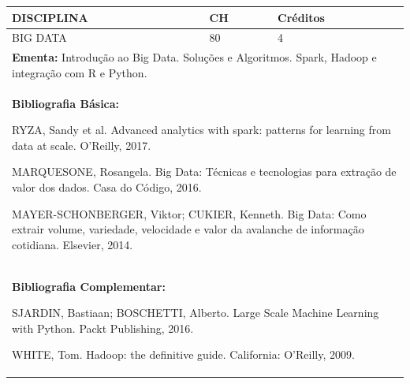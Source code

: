 \documentclass[a4paper, 12pt, openright, oneside, german, french, english, brazil]{abntex2}
\begin{document}
\begin{table}[!h]
  \footnotesize
  \centering
  \begin{tabular}{|p{100mm}|p{10mm}|p{20mm}|}
    \hline
    \textbf{DISCIPLINA} & \textbf{CH} & \textbf{Créditos} \\
    \hline
    BIG DATA & 80 & 4 \\
    \hline
    \multicolumn{3}{|p{130mm}|}{\textbf{Ementa:}  Introdução ao Big Data. Soluções e Algoritmos. Spark, Hadoop e integração com R e Python.} \\
    \hline
    \multicolumn{3}{|p{130mm}|}{\textbf{Bibliografia Básica:}

    RYZA, Sandy et al. Advanced analytics with spark: patterns for learning from data at scale. O'Reilly, 2017.

MARQUESONE, Rosangela. Big Data: Técnicas e tecnologias para extração de valor dos dados. Casa do Código, 2016.

MAYER-SCHONBERGER, Viktor; CUKIER, Kenneth. Big Data: Como extrair volume, variedade, velocidade e valor da avalanche de informação cotidiana. Elsevier, 2014.
} \\
    \hline
    \multicolumn{3}{|p{130mm}|}{\textbf{Bibliografia Complementar:}

    SJARDIN, Bastiaan; BOSCHETTI, Alberto. Large Scale Machine Learning with Python. Packt Publishing, 2016. 

WHITE, Tom. Hadoop: the definitive guide. California: O'Reilly, 2009.
} \\
    \hline
  \end{tabular}
\end{table}
\end{document}
